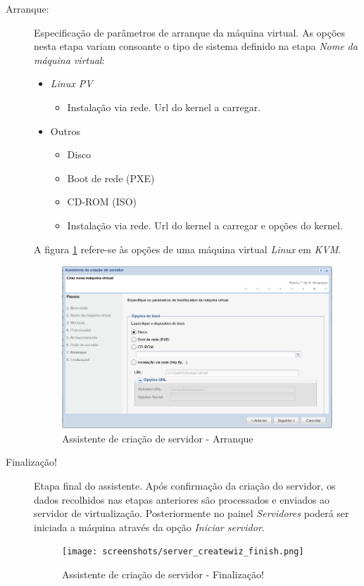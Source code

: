 \begin{description}
        \item[Arranque:] Especificação de parâmetros de arranque da máquina virtual. As opções nesta etapa variam consoante o tipo de sistema definido na etapa \emph{Nome da máquina virtual}:
		\label{sec:add_server_boot}
        \begin{itemize}
			\item \emph{Linux PV}
				\begin{itemize}
					\item Instalação via rede. Url do kernel a carregar.
				\end{itemize}
			\item Outros
				\begin{itemize}
                    \item Disco
					\item Boot de rede (PXE)
					\item CD-ROM (ISO)
					\item Instalação via rede. Url do kernel a carregar e opções do kernel.
				\end{itemize}
		\end{itemize}
        A figura \ref{fig:server_createwiz_startup} refere-se às opções de uma máquina virtual \emph{Linux} em \emph{KVM}.

		\begin{figure}[H]
			\begin{center}
			\includegraphics[scale=0.5]{screenshots/server_createwiz_startup.png}
			\caption{Assistente de criação de servidor - Arranque}
			\label{fig:server_createwiz_startup}
			\end{center}
		\end{figure}

	\item[Finalização!] Etapa final do assistente. Após confirmação da criação do servidor, os dados recolhidos nas etapas anteriores são processados e enviados ao servidor de virtualização. Posteriormente no painel \emph{Servidores} poderá ser iniciada a máquina através da opção \emph{Iniciar servidor}.
		\begin{figure}[H]
			\begin{center}
			\texttt{[image: screenshots/server\_createwiz\_finish.png]}
			\caption{Assistente de criação de servidor - Finalização!}
			\label{fig:server_createwiz_finish}
			\end{center}
		\end{figure}


\end{description}
